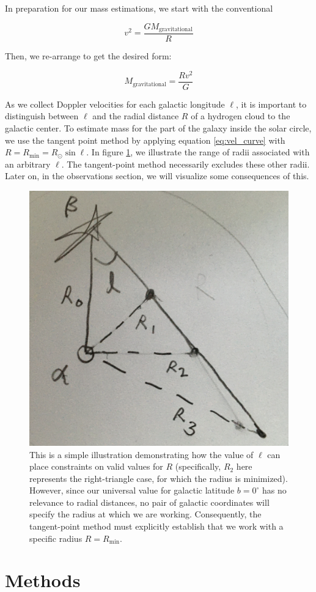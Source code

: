 \documentclass[12pt]{article}
\begin{document}
In preparation for our mass estimations, we start with the conventional

\begin{equation}
v^2 = \frac{G M_\text{gravitational}}{R} 
\end{equation}

Then, we re-arrange to get the desired form:

\begin{equation} \label{eq:mass}
M_\text{gravitational} = \frac{R v^2}{G} 
\end{equation}

As we collect Doppler velocities for each galactic longitude $\ell$, it is important to distinguish between $\ell$ and the radial distance $R$ of a hydrogen cloud to the galactic center. To estimate mass for the part of the galaxy inside the solar circle, we use the tangent point method by applying equation \ref{eq:vel_curve} with $R = R_\text{min} = R_\odot \sin \ell$. In figure \ref{fig:ell_vs_r}, we illustrate the range of radii associated with an arbitrary $\ell$. The tangent-point method necessarily excludes these other radii. Later on, in the observations section, we will visualize some consequences of this.

\begin{figure}
	\centering
	\includegraphics[width=.4\linewidth]{ell_versus_r}
	\caption{This is a simple illustration demonstrating how the value of $\ell$ can place constraints on valid values for $R$ (specifically, $R_2$ here represents the right-triangle case, for which the radius is minimized). However, since our universal value for galactic latitude $b = 0^\circ$ has no relevance to radial distances, no pair of galactic coordinates will specify the radius at which we are working. Consequently, the tangent-point method must explicitly establish that we work with a specific radius $R = R_\text{min}$.}
	\label{fig:ell_vs_r}
\end{figure}

\section{Methods}
\end{document}
